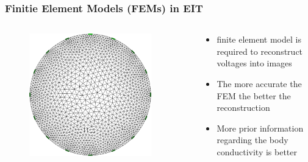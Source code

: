 \documentclass[10pt,    %
    english,            %
    xcolor=table,       %
    envcountsect,        %
    aspectratio=1610
]{beamer}
\begin{document}
\begin{frame}
	\frametitle{Finitie Element Models (FEMs) in EIT}    
	\begin{columns}[c]
		\begin{column}{0.5\textwidth}
			\begin{figure}[H]
				\centering
				\includegraphics[width=0.9\textwidth]{basic_mesh.png}
			\end{figure}
		\end{column}
		\begin{column}{0.5\textwidth}
			\begin{itemize}
				\item \alert{finite element model is required to reconstruct voltages into images}
				\item The more accurate the FEM the better the reconstruction  
				\item More prior information regarding the body conductivity is better
			\end{itemize}
		\end{column}
	\end{columns}
\end{frame}
\end{document}
